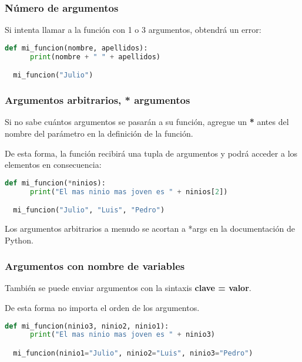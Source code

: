 \begin{frame}[fragile]
  \frametitle{Número de argumentos}

  Si intenta llamar a la función con 1 o 3 argumentos, obtendrá un error:

  \vspace{\baselineskip}
  \begin{lstlisting}[language=Python]
  def mi_funcion(nombre, apellidos):
      print(nombre + " " + apellidos)

  mi_funcion("Julio") 
  \end{lstlisting}
\end{frame}

\begin{frame}[fragile]
  \frametitle{Argumentos arbitrarios, * argumentos}

  \vspace{\baselineskip}
  Si no sabe cuántos argumentos se pasarán a su función,
  agregue un \textbf{*} antes del nombre del parámetro en la
  definición de la función.

  \vspace{\baselineskip}
  De esta forma, la función recibirá una tupla de argumentos
  y podrá acceder a los elementos en consecuencia: 

  \vspace{\baselineskip}
  \begin{lstlisting}[language=Python]
  def mi_funcion(*ninios):
      print("El mas ninio mas joven es " + ninios[2])

  mi_funcion("Julio", "Luis", "Pedro")
  \end{lstlisting}

  \pausa
  \begin{exampleblock}{}
    Los argumentos arbitrarios a menudo se acortan a *args en
    la documentación de Python.
  \end{exampleblock}
\end{frame}

\begin{frame}[fragile]
  \frametitle{Argumentos con nombre de variables}

  También se puede enviar argumentos con la sintaxis \textbf{clave = valor}.

  \vspace{\baselineskip}
  De esta forma no importa el orden de los argumentos. 

  \vspace{\baselineskip}
  \begin{lstlisting}[language=Python]
  def mi_funcion(ninio3, ninio2, ninio1):
      print("El mas ninio mas joven es " + ninio3)

  mi_funcion(ninio1="Julio", ninio2="Luis", ninio3="Pedro")
  \end{lstlisting}
\end{frame}

